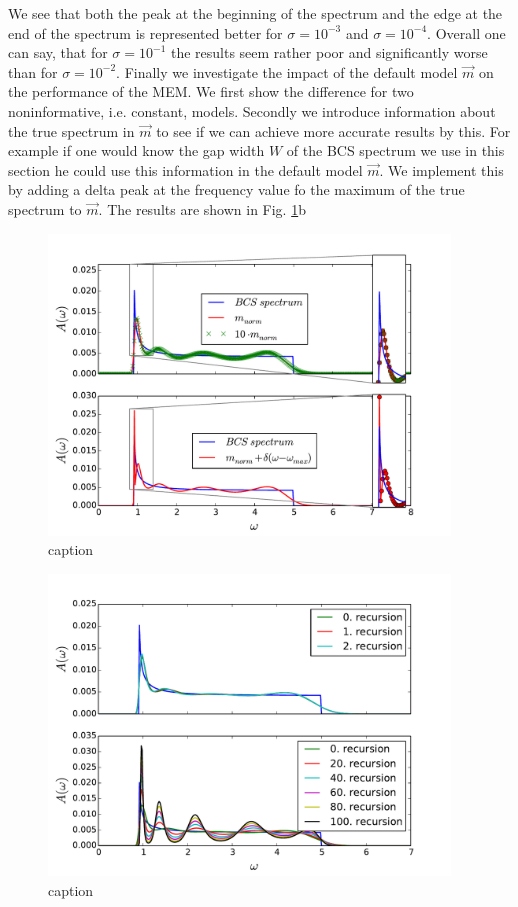 \FloatBarrier
We see that both the peak at the beginning of the spectrum and the edge at the end of the spectrum is represented better for $\sigma = 10^{-3}$ and $\sigma = 10^{-4}$. Overall one can say, that for $\sigma = 10^{-1}$ the results seem rather poor and significantly worse than for $\sigma = 10^{-2}$.\newline
Finally we investigate the impact of the default model $\vec m$ on the performance of the MEM. We first show the difference for two noninformative, i.e. constant, models.
Secondly we introduce information about the true spectrum in $\vec m$ to see if we can achieve more accurate results by this. For example if one would know the gap width $W$ of the BCS spectrum we use in this section he could use this information in the default model $\vec m$. We implement this by adding a delta peak at the frequency value fo the maximum of the true spectrum to $\vec m$. The results are shown in Fig. \ref{results:fig_6}b
\begin{figure}[htbp]
	\centering
	\includegraphics[width=0.95\textwidth]{./images/BCS_delta_peak_example.pdf}
	\caption{caption}
	\label{results:fig_6}
\end{figure}
\FloatBarrier
\begin{figure}[htbp]
	\centering
	\includegraphics[width=0.95\textwidth]{./images/BCS_annealing_example.pdf}
	\caption{caption}
	\label{results:fig_7}
\end{figure}
\FloatBarrier